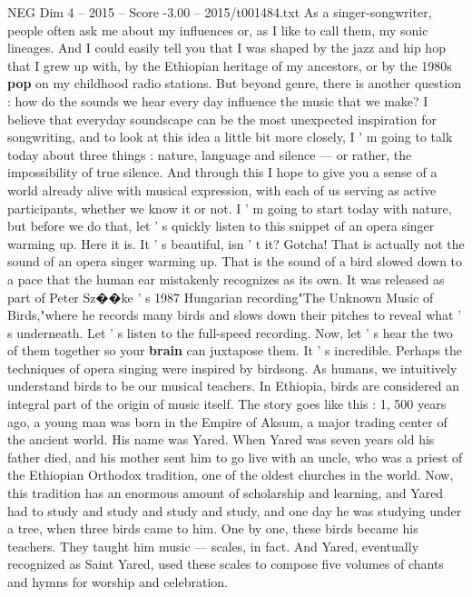 \begin{textsample}{NEG Dim 4 – 2015 – Score -3.00 – 2015/t001484.txt}  \label{ex:f4_neg_030}
As a singer-songwriter, people often ask me about my influences or, as I like to call them, my sonic lineages.
And I could easily tell you that I was shaped by the jazz and hip hop that I grew up with, by the Ethiopian heritage of my ancestors, or by the 1980s \textbf{pop} on my childhood radio stations.
But beyond genre, there is another question : how do the sounds we hear every day influence the music that we make?
I believe that everyday soundscape can be the most unexpected inspiration for songwriting, and to look at this idea a little bit more closely, I ' m going to talk today about three things : nature, language and silence — or rather, the impossibility of true silence.
And through this I hope to give you a sense of a world already alive with musical expression, with each of us serving as active participants, whether we know it or not.
I ' m going to start today with nature, but before we do that, let ' s quickly listen to this snippet of an opera singer warming up.
Here it is.
It ' s beautiful, isn ' t it?
Gotcha!
That is actually not the sound of an opera singer warming up.
That is the sound of a bird slowed down to a pace that the human ear mistakenly recognizes as its own.
It was released as part of Peter Sz{\EmojiFont �}{\EmojiFont �}ke ' s 1987 Hungarian recording"The Unknown Music of Birds,"where he records many birds and slows down their pitches to reveal what ' s underneath.
Let ' s listen to the full-speed recording.
Now, let ' s hear the two of them together so your \textbf{brain} can juxtapose them.
It ' s incredible.
Perhaps the techniques of opera singing were inspired by birdsong.
As humans, we intuitively understand birds to be our musical teachers.
In Ethiopia, birds are considered an integral part of the origin of music itself.
The story goes like this : 1, 500 years ago, a young man was born in the Empire of Aksum, a major trading center of the ancient world.
His name was Yared.
When Yared was seven years old his father died, and his mother sent him to go live with an uncle, who was a priest of the Ethiopian Orthodox tradition, one of the oldest churches in the world.
Now, this tradition has an enormous amount of scholarship and learning, and Yared had to study and study and study and study, and one day he was studying under a tree, when three birds came to him.
One by one, these birds became his teachers.
They taught him music — scales, in fact.
And Yared, eventually recognized as Saint Yared, used these scales to compose five volumes of chants and hymns for worship and celebration.

\end{textsample}
